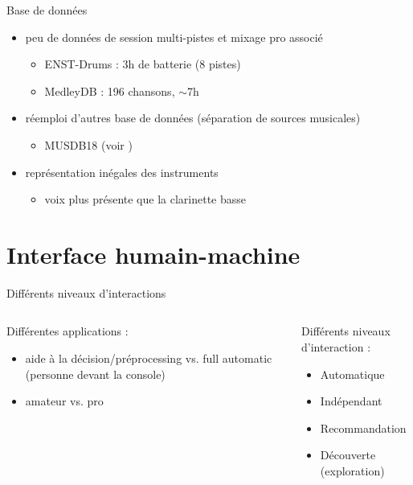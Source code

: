 \documentclass[9pt, aspectratio=169]{beamer}
\begin{document}
\begin{frame}{Base de données} %

	\begin{itemize}
		\item peu de données de session multi-pistes et mixage pro associé
		\begin{itemize}
			\item ENST-Drums : 3h de batterie (8 pistes)
			\item MedleyDB : 196 chansons, $\sim$7h \cite{bittner_medleydb_2014}
		\end{itemize}
		\item réemploi d'autres base de données (séparation de sources musicales)
		\begin{itemize}
			\item MUSDB18 (voir \cite{martinez-ramirez_automatic_2022})
		\end{itemize}
		\item représentation inégales des instruments \cite{bittner_medleydb_2014}
		\begin{itemize}
			\item voix plus présente que la clarinette basse
		\end{itemize}
	\end{itemize}

\end{frame}

\section{Interface humain-machine}
\begin{frame}{Différents niveaux d'interactions} %
\begin{columns}
    \begin{column}{0.48\textwidth}
		Différentes applications :
		\begin{itemize}
			\item aide à la décision/préprocessing vs. full automatic (personne devant la console)
			\item amateur vs. pro
		\end{itemize}

    \end{column}
    \begin{column}{0.48\textwidth}
		Différents niveaux d'interaction :
		\begin{itemize}
			\item Automatique
			\item Indépendant
			\item Recommandation
			\item Découverte (exploration)
		\end{itemize}
    \end{column}
\end{columns}
\end{frame}
\end{document}
